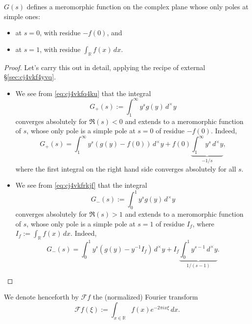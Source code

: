 \documentclass[reqno]{amsart}  \numberwithin{theorem}{section} \numberwithin{equation}{section}
\begin{document}
\begin{lemma}\label{lemma:cj56e5j3yz}
  $G(s)$ defines a meromorphic function on the complex plane whose only poles at simple ones:
  \begin{itemize}
  \item at $s = 0$, with residue $-f(0)$, and
  \item at $s = 1$, with residue $\int_{\mathbb{R}} f(x) \,d x $.
  \end{itemize}
\end{lemma}
\begin{proof}
  Let's carry this out in detail, applying the recipe of external \S\ref{sec:cj4vkf4yvq}.
  \begin{itemize}
  \item We see from \eqref{eq:cj4vkfq4ku} that the integral
    \begin{equation*}
      G_+(s) := \int_1^\infty y^s g(y) \,d^\times y
    \end{equation*}
    converges absolutely for $\Re(s) < 0$ and extends to a meromorphic function of $s$, whose only pole is a simple pole at $s = 0$ of residue $-f(0)$.  Indeed,
    \begin{equation*}
      G_+(s) = \int_1^\infty y^s \left(g (y) - f(0) \right) \,d^\times y
      + f(0)
      \underbrace
      {
        \int_1^\infty y^{s} \,d^\times y
      }_{
        -1/s
      },
    \end{equation*}
    where the first integral on the right hand side converges absolutely for all $s$.
  \item We see from \eqref{eq:cj4vkfrkjf} that the integral
    \begin{equation*}
      G_-(s) := \int_0^1 y^s g(y) \,d^\times y
    \end{equation*}
    converges absolutely for $\Re(s) > 1$ and extends to a meromorphic function of $s$, whose only pole is a simple pole at $s = 1$ of residue $I_f$, where $I_f := \int_{\mathbb{R} } f (x) \, d x$.  Indeed,
    \begin{equation*}
      G_-(s) = \int_0^1 y^s \left( g (y) - y^{-1} I_f \right) \,d^\times y + I_f \underbrace
      {
        \int_0^1 y^{s-1} \,d^\times y
      }_{
        1/(s-1)
      }.
    \end{equation*}
  \end{itemize}
\end{proof}

We denote henceforth by $\mathcal{F} f$ the (normalized) Fourier transform
\begin{equation*}
  \mathcal{F} f (\xi) := \int_{x \in \mathbb{R} } f(x) e^{- 2 \pi i x \xi } \, d x.
\end{equation*}
\end{document}
